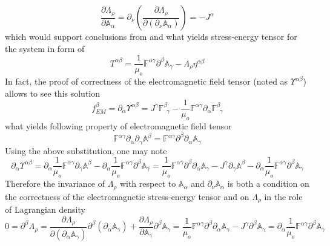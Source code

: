 \documentclass[aps,prx,preprint,groupedaddress,showkeys]{revtex4-2}
\begin{document}
\begin{equation} \label{CLASSLAGNEW}
\frac{\partial \Lambda_{\rho}} {\partial \mathbb{A}_{\alpha}} =  \partial_{\nu}  \left (  \frac{\partial \Lambda_{\rho}}{\partial (\partial_{\nu} \mathbb{A}_{\alpha} )}   \right ) = - J^{\alpha}
\end{equation}
which would support conclusions from \cite{ALL1} and what yields stress-energy tensor for the system in form of
\begin{equation} \label{TensSep1}
T^{\alpha \beta} = \frac{1}{\mu_o}\mathbb{F}^{\alpha \gamma} \partial^{\beta} \mathbb{A}_{\gamma} -  \Lambda_{\rho} \eta^{\alpha \beta}
\end{equation}
In fact, the proof of correctness of the electromagnetic field tensor (noted as $\Upsilon^{\alpha \beta}$) allows to see this solution
\begin{equation} \label{Ups1}
f_{EM}^{\beta} = \partial_{\alpha} \Upsilon^{\alpha \beta} = J^{\gamma}\mathbb{F}^{\beta}_{\, \, \, \gamma} - \frac{1}{\mu_o}\mathbb{F}^{\alpha \gamma} \partial_{\alpha} \mathbb{F}^{\beta}_{\, \, \, \gamma}
\end{equation}
what yields following property of electromagnetic field tensor
\begin{equation} \label{Ups2}
\mathbb{F}^{\alpha \gamma} \partial_{\alpha} \partial_{\gamma} \mathbb{A}^{\beta} 
 = \mathbb{F}^{\alpha \gamma}  \partial^{\beta} \partial_{\alpha} \mathbb{A}_{\gamma} \end{equation}
Using the above substitution, one may note
\begin{equation} \label{TensorProof}
\partial_{\alpha} \Upsilon^{\alpha \beta} = \partial_{\alpha} \frac{1}{\mu_o} \mathbb{F}^{\alpha \gamma} \partial_{\gamma} \mathbb{A}^{\beta} - \partial_{\alpha} \frac{1}{\mu_o} \mathbb{F}^{\alpha \gamma} \partial^{\beta} \mathbb{A}_{\gamma} = \frac{1}{\mu_o} \mathbb{F}^{\alpha \gamma} \partial^{\beta} \partial_{\alpha} \mathbb{A}_{\gamma} - J^{\gamma}\partial_{\gamma} \mathbb{A}^{\beta} - \partial_{\alpha} \frac{1}{\mu_o} \mathbb{F}^{\alpha \gamma} \partial^{\beta} \mathbb{A}_{\gamma}
\end{equation}
Therefore the invariance of $\Lambda_{\rho}$ with respect to $\mathbb{A}_{\alpha}$ and  $\partial_{\nu} \mathbb{A}_{\alpha}$ is both a condition on the correctness of the electromagnetic stress-energy tensor and on $\Lambda_{\rho}$ in the role of Lagrangian density
\begin{equation} \label{TENSCORR}
0 = \partial^{\beta} \Lambda_{\rho} = \frac{\partial \Lambda_{\rho}}{\partial (\partial_{\alpha} \mathbb{A}_{\gamma})} \partial^{\beta} (\partial_{\alpha} \mathbb{A}_{\gamma}) + \frac{\partial \Lambda_{\rho}} {\partial \mathbb{A}_{\gamma}} \partial^{\beta} \mathbb{A}_{\gamma} = \frac{1}{\mu_o} \mathbb{F}^{\alpha \gamma} \partial^{\beta} \partial_{\alpha} \mathbb{A}_{\gamma}  - J^{\gamma} \partial^{\beta} \mathbb{A}_{\gamma} = \partial_{\alpha} \frac{1}{\mu_o} \mathbb{F}^{\alpha \gamma} \partial^{\beta} \mathbb{A}_{\gamma}
\end{equation}
\end{document}
